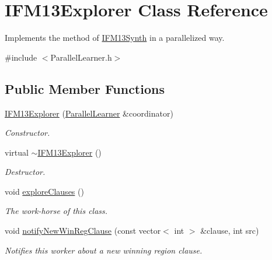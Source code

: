 \hypertarget{classIFM13Explorer}{\section{I\-F\-M13\-Explorer Class Reference}
\label{classIFM13Explorer}
}


Implements the method of \hyperlink{classIFM13Synth}{I\-F\-M13\-Synth} in a parallelized way.  




{\ttfamily \#include $<$Parallel\-Learner.\-h$>$}

\subsection*{Public Member Functions}
\begin{DoxyCompactItemize}
\item 
\hyperlink{classIFM13Explorer_a8830825d1b7347fb02e7a74f7e558e2d}{I\-F\-M13\-Explorer} (\hyperlink{classParallelLearner}{Parallel\-Learner} \&coordinator)
\begin{DoxyCompactList}\small\item\em Constructor. \end{DoxyCompactList}\item 
virtual \hyperlink{classIFM13Explorer_a7334013d4c514c392e0c38ee89a85b76}{$\sim$\-I\-F\-M13\-Explorer} ()
\begin{DoxyCompactList}\small\item\em Destructor. \end{DoxyCompactList}\item 
void \hyperlink{classIFM13Explorer_a19efbbf6644d73d9d7d662b121e3d151}{explore\-Clauses} ()
\begin{DoxyCompactList}\small\item\em The work-\/horse of this class. \end{DoxyCompactList}\item 
void \hyperlink{classIFM13Explorer_a37e60ac394b868d5f375c5b684aeaebc}{notify\-New\-Win\-Reg\-Clause} (const vector$<$ int $>$ \&clause, int src)
\begin{DoxyCompactList}\small\item\em Notifies this worker about a new winning region clause. \end{DoxyCompactList}\end{DoxyCompactItemize}

